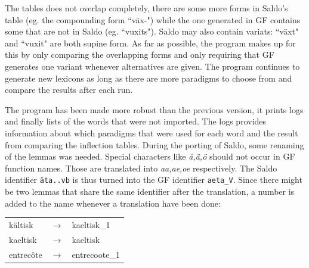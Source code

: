 \documentclass{report}
\begin{document}
The tables does not overlap completely, there are some more forms in Saldo's table (eg. the 
compounding form ``väx-")
while the one generated in GF contains some that are not in Saldo (eg. ``vuxits").
Saldo may also contain variats: ``växt" and ``vuxit" are both supine form.
As far as possible, the program makes up for this by only comparing the overlapping forms
and only requiring that GF generates one variant whenever alternatives are given. 
The program continues to generate new lexicons as long as there are more
paradigms to choose from and compare the results after each run.


The program has been made more robust than the previous version, it prints
logs and finally lists of the words that were not imported. The logs provides
information about which paradigms that were used for each word and the result
from comparing the inflection tables.
During the porting of Saldo, some renaming of the lemmas was needed.
Special characters like \emph{å,ä,ö} should not occur in GF function names.
Those are translated into \emph{aa,ae,oe} respectively. 
The Saldo identifier \verb|äta..vb| is thus turned into the GF identifier \verb|aeta_V|.
Since there might be two lemmas that share the same
identifier after the translation, a number is added to the name whenever a translation
have been done: 
\begin{tabular}{lll}
kältisk & $\rightarrow$ & kaeltisk\_1 \\
kaeltisk & $\rightarrow$ & kaeltisk \\
entrecôte &$\rightarrow$ & entrecoote\_1 \\ 
\end{tabular}


\end{document}
